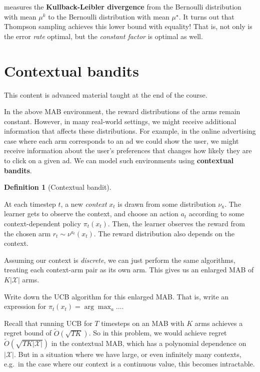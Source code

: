 \documentclass[
  letterpaper,
  DIV=11,
  numbers=noendperiod]{scrreprt}
\theoremstyle{plain}
\theoremstyle{plain}
\theoremstyle{definition}
\theoremstyle{definition}
\newtheorem{definition}{Definition}[chapter]
\theoremstyle{remark}
\begin{document}
measures the \textbf{Kullback-Leibler divergence} from the Bernoulli
distribution with mean \(\mu^k\) to the Bernoulli distribution with mean
\(\mu^\star\). It turns out that Thompson sampling achieves this lower
bound with equality! That is, not only is the error \emph{rate} optimal,
but the \emph{constant factor} is optimal as well.

\section{Contextual bandits}\label{contextual-bandits}

This content is advanced material taught at the end of the course.

In the above MAB environment, the reward distributions of the arms
remain constant. However, in many real-world settings, we might receive
additional information that affects these distributions. For example, in
the online advertising case where each arm corresponds to an ad we could
show the user, we might receive information about the user's preferences
that changes how likely they are to click on a given ad. We can model
such environments using \textbf{contextual bandits}.

\begin{definition}[Contextual
bandit]\protect\hypertarget{def-contextual_bandit}{}\label{def-contextual_bandit}

At each timestep \(t\), a new \emph{context} \(x_t\) is drawn from some
distribution \(\nu_{\text{x}}\). The learner gets to observe the
context, and choose an action \(a_t\) according to some
context-dependent policy \(\pi_t(x_t)\). Then, the learner observes the
reward from the chosen arm \(r_t \sim \nu^{a_t}(x_t)\). The reward
distribution also depends on the context.

\end{definition}

Assuming our context is \emph{discrete}, we can just perform the same
algorithms, treating each context-arm pair as its own arm. This gives us
an enlarged MAB of \(K |\mathcal{X}|\) arms.

Write down the UCB algorithm for this enlarged MAB. That is, write an
expression for \(\pi_t(x_t) = \arg\max_a \dots\).

Recall that running UCB for \(T\) timesteps on an MAB with \(K\) arms
achieves a regret bound of \(\tilde{O}(\sqrt{TK})\). So in this problem,
we would achieve regret \(\tilde{O}(\sqrt{TK|\mathcal{X}|})\) in the
contextual MAB, which has a polynomial dependence on \(|\mathcal{X}|\).
But in a situation where we have large, or even infinitely many
contexts, e.g.~in the case where our context is a continuous value, this
becomes intractable.
\end{document}
